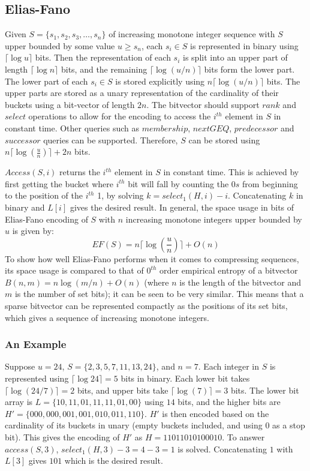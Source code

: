 \subsection{Elias-Fano}
\label{elias-fano}
Given $S = \{s_1, s_2, s_3, \ldots, s_n \}$ of increasing monotone integer sequence with $S$ upper bounded by some value $u \geq s_n$, each $s_i \in S$ is represented in binary using $\lceil \log u \rceil$ bits. Then the representation of each $s_i$ is split into an upper part of length $\lceil \log n \rceil$ bits, and the remaining $\lceil \log (u/n) \rceil$ bits form the lower part. The lower part of each $s_i \in S$ is stored explicitly using $n\lceil \log (u/n) \rceil$ bits. The upper parts are stored as a unary representation of the cardinality of their buckets using a bit-vector of length $2n$. The bitvector should support $rank$ and $select$ operations to allow for the encoding to access the $i^{th}$ element in $S$ in constant time. Other queries such as $membership$, $nextGEQ$, $predecessor$ and $successor$ queries can be supported. Therefore, $S$ can be stored using $n\lceil \log (\frac{u}{n}) \rceil + 2n$ bits.\par
$Access(S, i)$ returns the $i^{th}$ element in $S$ in constant time. This is achieved by first getting the bucket where $i^{th}$ bit will fall by counting the $0s$ from beginning to the position of the $i^{th}$ 1, by solving $k = select_1(H, i)-i$. Concatenating $k$ in binary and $L[i]$ gives the desired result. In general, the space usage in bits of Elias-Fano encoding of $S$ with $n$ increasing monotone integers upper bounded by $u$ is given by: 
\[EF(S) = n\lceil \log (\frac{u}{n}) \rceil + O(n) \tag{3} \label{eq:3} \]
To show how well Elias-Fano performs when it comes to compressing sequences, its space usage is compared to that of $0^{th}$ order empirical entropy of a bitvector $B(n, m) = n\log (m/n) + O(n)$ (where $n$ is the length of the bitvector and $m$ is the number of set bits); it can be seen to be very similar. This means that a sparse bitvector can be represented compactly as the positions of its set bits, which gives a sequence of increasing monotone integers.
\subsubsection{An Example}
Suppose $u = 24$, $S=\{2, 3, 5, 7, 11, 13, 24\}$, and $n=7$. Each integer in $S$ is represented using $\lceil \log 24 \rceil = 5$ bits in binary. Each lower bit takes $\lceil \log(24/7) \rceil = 2$ bits, and upper bits take $\lceil \log (7) \rceil = 3$ bits. The lower bit array is $L = \{10, 11, 01, 11, 11, 01, 00\}$ using $14$ bits, and the higher bits are $H' = \{000, 000, 001, 001, 010, 011, 110\}$. $H'$ is then encoded based on the cardinality of its buckets in unary (empty buckets included, and using $0$ as a stop bit). This gives the encoding of $H'$ as $H = 11011010100010$. To answer $access(S, 3)$, $select_1(H, 3) - 3 = 4-3 = 1$ is solved. Concatenating $1$ with $L[3]$ gives $101$ which is the desired result.
